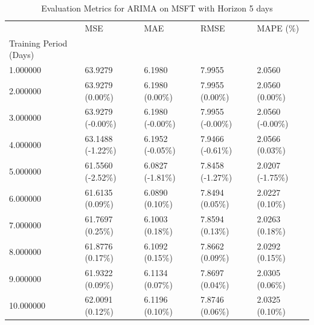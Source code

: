 \begin{table}
\caption{Evaluation Metrics for ARIMA on MSFT with Horizon 5 days}
\label{tab:arima_MSFT_h5_metrics}
\begin{tabular}{lllll}
\toprule
 & MSE & MAE & RMSE & MAPE (\%) \\
Training Period (Days) &  &  &  &  \\
\midrule
1.000000 & 63.9279 & 6.1980 & 7.9955 & 2.0560 \\
2.000000 & 63.9279 (0.00\%) & 6.1980 (0.00\%) & 7.9955 (0.00\%) & 2.0560 (0.00\%) \\
3.000000 & 63.9279 (-0.00\%) & 6.1980 (-0.00\%) & 7.9955 (-0.00\%) & 2.0560 (-0.00\%) \\
4.000000 & 63.1488 (-1.22\%) & 6.1952 (-0.05\%) & 7.9466 (-0.61\%) & 2.0566 (0.03\%) \\
5.000000 & 61.5560 (-2.52\%) & 6.0827 (-1.81\%) & 7.8458 (-1.27\%) & 2.0207 (-1.75\%) \\
6.000000 & 61.6135 (0.09\%) & 6.0890 (0.10\%) & 7.8494 (0.05\%) & 2.0227 (0.10\%) \\
7.000000 & 61.7697 (0.25\%) & 6.1003 (0.18\%) & 7.8594 (0.13\%) & 2.0263 (0.18\%) \\
8.000000 & 61.8776 (0.17\%) & 6.1092 (0.15\%) & 7.8662 (0.09\%) & 2.0292 (0.15\%) \\
9.000000 & 61.9322 (0.09\%) & 6.1134 (0.07\%) & 7.8697 (0.04\%) & 2.0305 (0.06\%) \\
10.000000 & 62.0091 (0.12\%) & 6.1196 (0.10\%) & 7.8746 (0.06\%) & 2.0325 (0.10\%) \\
\bottomrule
\end{tabular}
\end{table}
